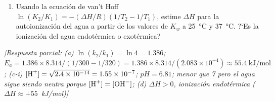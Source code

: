 \begin{bloque_ejercicios}
\begin{ejercicios}
\begin{enumerate}[label=\alph*)]
    \item Usando la ecuaci\'on de van't Hoff
          $\ln(K_2/K_1) = -(\Delta H/R)(1/T_2 - 1/T_1)$,
          estime $\Delta H$ para la autoionizaci\'on del agua
          a partir de los valores de $K_w$ a \SI{25}{\celsius}
          y \SI{37}{\celsius}. ?`Es la ionizaci\'on del agua
          endot\'ermica o exot\'ermica?
\end{enumerate}

\textit{[Respuesta parcial:
(a) $\ln(k_2/k_1) = \ln 4 = 1.386$;
    $E_a = 1.386 \times 8.314 /
    (1/300 - 1/320) = 1.386\times8.314/
    (2.083\times10^{-4}) \approx \SI{55.4}{\kilo\joule\per\mole}$;
(c-i) $[\ce{H+}] = \sqrt{2.4\times10^{-14}} = 1.55\times10^{-7}$;
      $pH = 6.81$; menor que 7 pero el agua sigue siendo neutra
      porque $[\ce{H+}]=[\ce{OH-}]$;
(d) $\Delta H > 0$, ionizaci\'on endot\'ermica
    ($\Delta H \approx +55$~kJ/mol)]}

\end{ejercicios}

\end{bloque_ejercicios}
